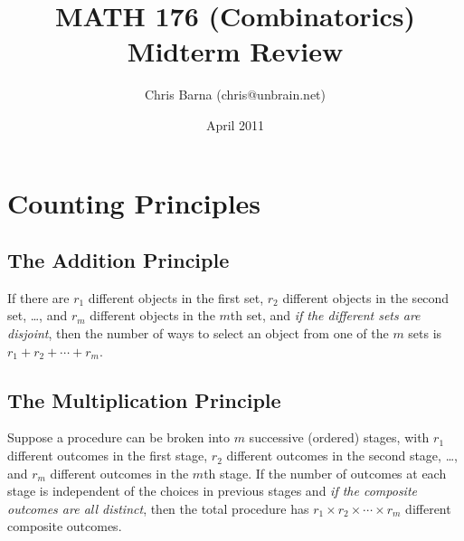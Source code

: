 \documentclass{article}
\begin{document}
\title{MATH 176 (Combinatorics) Midterm Review}
\author{Chris Barna (chris@unbrain.net)}
\date{April 2011}
\maketitle

\section{Counting Principles}

\subsection{The Addition Principle}
If there are $r_1$ different objects in the first set, $r_2$ different
objects in the second set, \dots, and $r_m$ different objects in the
$m$th set, and \emph{if the different sets are disjoint}, then the
number of ways to select an object from one of the $m$ sets is
$r_1+r_2+\cdots+r_m$.

\subsection{The Multiplication Principle}
Suppose a procedure can be broken into $m$ successive (ordered) stages,
with $r_1$ different outcomes in the first stage, $r_2$ different
outcomes in the second stage, \dots, and $r_m$ different outcomes in the
$m$th stage. If the number of outcomes at each stage is independent of
the choices in previous stages and \emph{if the composite outcomes are
all distinct}, then the total procedure has $r_1\times r_2 \times \cdots
\times r_m$ different composite outcomes.
\end{document}
